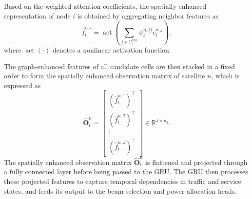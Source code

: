 \documentclass[journal]{IEEEtran}
\begin{document}
Based on the weighted attention coefficients, the spatially enhanced representation of node $i$ is obtained by aggregating neighbor features as
\begin{equation}
\hat f_t^{n,i}=\operatorname{act}\left(\sum_{j\in\mathcal V_i^{\mathrm{nbr}}}\psi_t^{n,ij} v_t^{n,j}\right),
\label{eq:mappo-spatial-feature}
\end{equation}
where $\operatorname{act}(\cdot)$ denotes a nonlinear activation function.

The graph-enhanced features of all candidate cells are then stacked in a fixed order to form the spatially enhanced observation matrix of satellite $n$, which is expressed as 
\begin{equation}
\hat{\mathbf O}_t^n=
\begin{bmatrix}
(\hat f_t^{n,1})^\top\\
(\hat f_t^{n,2})^\top\\
\vdots\\
(\hat f_t^{n,J})^\top
\end{bmatrix}
\in\mathbb{R}^{J\times d_g}.
\label{eq:mappo-spatial-obs}
\end{equation}
The spatially enhanced observation matrix $\hat{\mathbf O}_t^n$ is flattened and projected through a fully connected layer before being passed to the GRU. The GRU then processes these projected features to capture temporal dependencies in traffic and service states, and feeds its output to the beam-selection and power-allocation heads.
\end{document}
